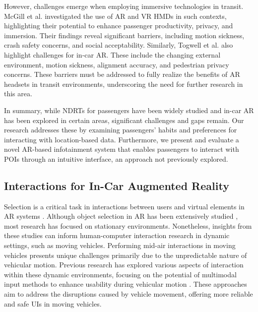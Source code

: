 However, challenges emerge when employing immersive technologies in transit. McGill et al. \cite{mcgill2020challenges} investigated the use of AR and VR HMDs in such contexts, highlighting their potential to enhance passenger productivity, privacy, and immersion. Their findings reveal significant barriers, including motion sickness, crash safety concerns, and social acceptability. Similarly, Togwell et al. \cite{Togwell2022gaming} also highlight challenges for in-car AR. These include the changing external environment, motion sickness, alignment accuracy, and pedestrian privacy concerns. These barriers must be addressed to fully realize the benefits of AR headsets in transit environments, underscoring the need for further research in this area.

In summary, while NDRTs for passengers have been widely studied and in-car AR has been explored in certain areas, significant challenges and gaps remain. Our research addresses these by examining passengers' habits and preferences for interacting with location-based data. Furthermore, we present and evaluate a novel AR-based infotainment system that enables passengers to interact with POIs through an intuitive interface, an approach not previously explored.


\subsection{Interactions for In-Car Augmented Reality}
Selection is a critical task in interactions between users and virtual elements in AR systems \cite{blattgerste2018advantages, Doerner2022}. Although object selection in AR has been extensively studied \cite{nizam2018review, hertel2021taxonomy, kyto2018pinpointing, zhou2008trends, blattgerste2018advantages}, most research has focused on stationary environments. Nonetheless, insights from these studies can inform human-computer interaction research in dynamic settings, such as moving vehicles. 
Performing mid-air interactions in moving vehicles presents unique challenges primarily due to the unpredictable nature of vehicular motion. Previous research has explored various aspects of interaction within these dynamic environments, focusing on the potential of multimodal input methods to enhance usability during vehicular motion \cite{roider2018SeeYourPoint}. These approaches aim to address the disruptions caused by vehicle movement, offering more reliable and safe UIs in moving vehicles.

